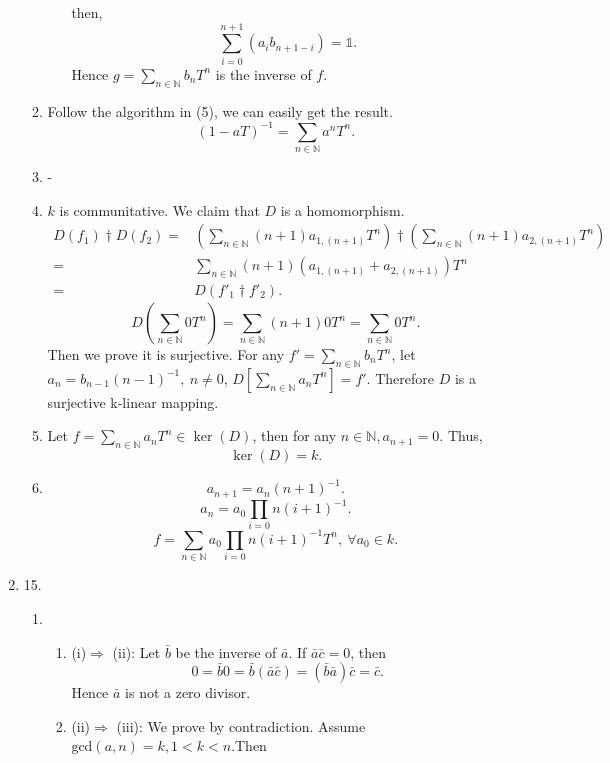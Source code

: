 \documentclass[12pt]{article}
\newcommand{\NN}{\mathbb{N}}
\begin{document}
\begin{enumerate}
\begin{enumerate}
\begin{enumerate}
                        then,
                        $$\sum_{i=0}^{n+1}(a_ib_{n+1-i})=\mathds{1}.$$
                        Hence $\displaystyle g=\sum_{n\in \NN}b_nT^n$ is the inverse of $f$.
                \end{enumerate}
                \item Follow the algorithm in (5), we can easily get the result.
                    $$(1-aT)^{-1}=\sum_{n\in \NN}a^nT^n.$$
                \item -
                \item $k$ is communitative. We claim that $D$ is a homomorphism. 
                    \begin{align*}
                        D(f_1)\dagger D(f_2)=&\left(\sum_{n\in \NN}(n+1)a_{1,(n+1)}T^n\right)\dagger \left(\sum_{n\in \NN}(n+1)a_{2,(n+1)}T^n\right)\\
                        =&\sum_{n\in \NN}(n+1)(a_{1,(n+1)}+ a_{2,(n+1)})T^n\\
                        =&D\left(f'_1\dagger f'_2\right).
                    \end{align*}
                    $$
                        D\left(\sum_{n\in\NN}0T^n\right)=\sum_{n\in \NN}(n+1)0T^n=\sum_{n\in \NN}0T^n.
                    $$
                    Then we prove it is surjective. For any $f'=\sum_{n\in \NN}b_nT^n$, let $a_n=b_{n-1}(n-1)^{-1},\ n\not=0$, $D[\sum_{n\in\NN}a_nT^n]=f'$. Therefore $D$ is a surjective k-linear mapping.
                \item Let $\displaystyle f=\sum_{n\in \NN}a_nT^n\in \ker(D)$, then for any $n\in\NN,a_{n+1}=0.$ Thus, 
                    $$\ker(D)=k.$$
                \item $$a_{n+1}=a_n(n+1)^{-1}.$$
                    $$a_n=a_0\prod_{i=0}{n}(i+1)^{-1}.$$
                    $$f=\sum_{n\in\NN}a_0\prod_{i=0}{n}(i+1)^{-1}T^n,\ \forall a_0\in k.$$
        \end{enumerate}
        \item 15.
            \begin{enumerate}
                \item 
                    \begin{enumerate}
                        \item (i)$\Rightarrow$ (ii): Let $\bar{b}$ be the inverse of $\bar{a}$. If $\bar{a}\bar{c}=0$, then
                            $$0=\bar{b}0=\bar{b}(\bar{a}\bar{c})=(\bar{b}\bar{a})\bar{c}=\bar{c}.$$
                            Hence $\bar{a}$ is not a zero divisor.
                        \item (ii)$\Rightarrow$ (iii): We prove by contradiction. Assume $\mathrm{gcd}(a,n)=k,1<k<n$.Then

\end{enumerate}
\end{enumerate}
\end{enumerate}
\end{document}
